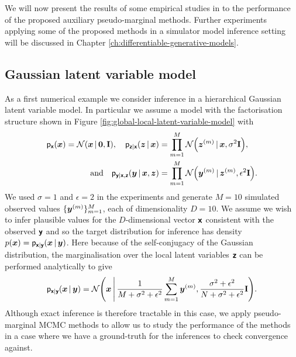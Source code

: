 We will now present the results of some empirical studies in to the performance of the proposed auxiliary pseudo-marginal methods. Further experiments applying some of the proposed methods in a simulator model inference setting will be discussed in Chapter \ref{ch:differentiable-generative-models}.

\subsection{Gaussian latent variable model}\label{subsec:pm-normal-latent-model-exp}

As a first numerical example we consider inference in a hierarchical Gaussian latent variable model. In particular we assume a model with the factorisation structure shown in Figure \ref{fig:global-local-latent-variable-model} with
\begin{equation}
\begin{split}
\pden{\rvct{x}}(\vct{x}) = \nrm{\vct{x}\gvn\vct{0},\mathbf{I}},
\quad
\pden{\rvct{z}|\rvct{x}}(\vct{z}\gvn\vct{x}) &= \prod_{m=1}^M \nrm{\vct{z}^{(m)}\gvn\vct{x},\sigma^2\mathbf{I}},\\
\quad\textrm{and}\quad
\pden{\rvct{y}|\rvct{x},\rvct{z}}(\vct{y}\gvn\vct{x},\vct{z}) &= \prod_{m=1}^M \nrm{\vct{y}^{(m)}\gvn\vct{z}^{(m)},\epsilon^2\mathbf{I}}.
\end{split}
\end{equation}
We used $\sigma=1$ and $\epsilon=2$ in the experiments and generate $M=10$ simulated observed values $\lbrace \boldsymbol{y}^{(m)}\rbrace_{m=1}^M$, each of dimensionality $D=10$. We assume we wish to infer plausible values for the $D$-dimensional vector $\boldsymbol{\mathsf{x}}$ consistent with the observed $\boldsymbol{\mathsf{y}}$ and so the target distribution for inference has density $p(\boldsymbol{x}) = \mathsf{p}_{\boldsymbol{\mathsf{x}}|\boldsymbol{\mathsf{y}}}(\boldsymbol{x}\operatorname{|}\boldsymbol{y})$. Here because of the self-conjugacy of the Gaussian distribution, the marginalisation over the local latent variables $\boldsymbol{\mathsf{z}}$ can be performed analytically to give
\begin{equation}\label{eq:gaussian-latent-model-analytic-posterior}
  \pden{\rvct{x}|\rvct{y}}(\vct{x}\gvn\vct{y}) =
  \nrm{\vct{x} \,\middle|\, \frac{1}{M + \sigma^2 + \epsilon^2} \sum_{m=1}^M \vct{y}^{(m)}, \frac{\sigma^2+\epsilon^2}{N + \sigma^2 + \epsilon^2} \mathbf{I}}.
\end{equation}
Although exact inference is therefore tractable in this case, we apply pseudo-marginal \ac{MCMC} methods to allow us to study the performance of the methods in a case where we have a ground-truth for the inferences to check convergence against.

